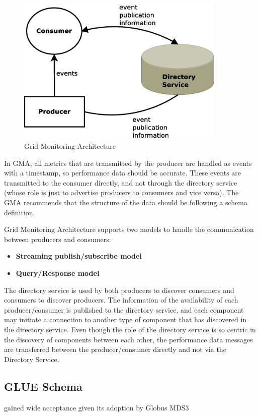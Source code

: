 \begin{figure}[htb]
\centering
 \includegraphics[width=100mm]{images/gma.eps}
\caption{Grid Monitoring Architecture}
\label{figure:gma}
\end{figure}

In GMA, all metrics that are transmitted by the producer are handled as events with a timestamp, so performance data should be accurate. These events are transmitted to the consumer directly, and not through the directory service (whose role is just to advertise producers to consumers and vice versa). The GMA recommends that the structure of the data should be following a schema definition. 

Grid Monitoring Architecture supports two models to handle the communication between producers and consumers:

\begin{itemize}
\item {\bf Streaming publish/subscribe model}
\item {\bf Query/Response model}
\end{itemize}

The directory service is used by both producers to discover consumers and consumers to discover producers. The information of the availability of each producer/consumer is published to the directory service, and each component may initiate a connection to another type of component that has discovered in the directory service. Even though the role of the directory service is so centric in the discovery of components between each other, the performance data messages are transferred between the producer/consumer directly and not via the Directory Service.

\subsection{GLUE Schema}
gained wide acceptance given its adoption by Globus MDS3

